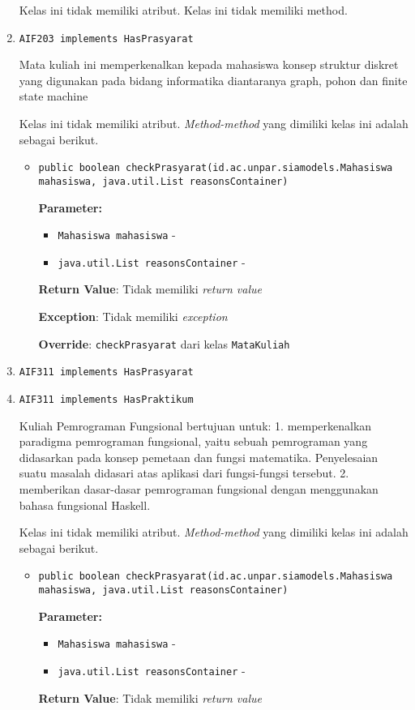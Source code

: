\documentclass{article}
\begin{document}
\begin{enumerate}
Kelas ini tidak memiliki atribut. Kelas ini tidak memiliki method. \item \texttt{AIF203 implements HasPrasyarat}

Mata kuliah ini memperkenalkan kepada mahasiswa konsep struktur diskret yang 
 digunakan pada bidang informatika diantaranya graph, pohon dan finite state 
 machine

Kelas ini tidak memiliki atribut. \textit{Method-method} yang dimiliki kelas ini adalah sebagai berikut.
\begin{itemize}
\item \texttt{public boolean checkPrasyarat(id.ac.unpar.siamodels.Mahasiswa mahasiswa, java.util.List reasonsContainer)}

\textbf{Parameter:}
\begin{itemize}
\item \texttt{Mahasiswa mahasiswa} - 
\item \texttt{java.util.List reasonsContainer} - 
\end{itemize}
\textbf{Return Value}: Tidak memiliki \textit{return value}

\textbf{Exception}: Tidak memiliki \textit{exception}

\textbf{Override}: \texttt{checkPrasyarat} dari kelas \texttt{MataKuliah}

\end{itemize}
\item \texttt{AIF311 implements HasPrasyarat}

\item \texttt{AIF311 implements HasPraktikum}

Kuliah Pemrograman Fungsional bertujuan untuk: 1. memperkenalkan paradigma
 pemrograman fungsional, yaitu sebuah pemrograman yang didasarkan pada konsep
 pemetaan dan fungsi matematika. Penyelesaian suatu masalah didasari atas
 aplikasi dari fungsi-fungsi tersebut. 2. memberikan dasar-dasar pemrograman
 fungsional dengan menggunakan bahasa fungsional Haskell.

Kelas ini tidak memiliki atribut. \textit{Method-method} yang dimiliki kelas ini adalah sebagai berikut.
\begin{itemize}
\item \texttt{public boolean checkPrasyarat(id.ac.unpar.siamodels.Mahasiswa mahasiswa, java.util.List reasonsContainer)}

\textbf{Parameter:}
\begin{itemize}
\item \texttt{Mahasiswa mahasiswa} - 
\item \texttt{java.util.List reasonsContainer} - 
\end{itemize}
\textbf{Return Value}: Tidak memiliki \textit{return value}


\end{itemize}
\end{enumerate}
\end{document}
